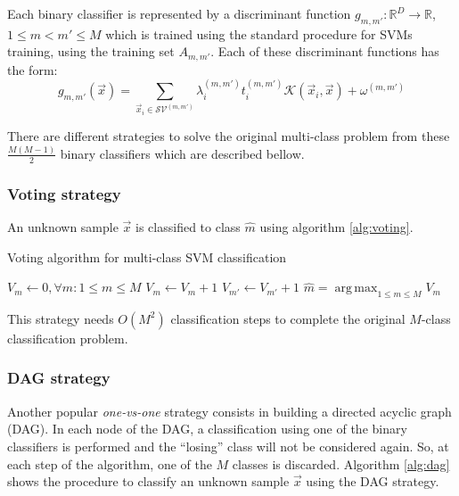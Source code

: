 \documentclass[10pt,a4paper]{article}
\DeclareMathOperator*{\argmax}{arg\,max}
\begin{document}
Each binary classifier is represented by a discriminant function $g_{m,m'} : \mathbb{R}^D \rightarrow \mathbb{R}$, $1 \leq m < m' \leq M$ which is trained using the standard procedure for SVMs training, using the training set $A_{m,m'}$. Each of these discriminant functions has the form:\\

\begin{equation}
g_{m,m'}(\vec{x}) = \sum_{\vec{x}_i \in \mathcal{SV}^{(m,m')}} \lambda_i^{(m,m')} t_i^{(m,m')} \mathcal{K}(\vec{x}_i, \vec{x}) + \omega^{(m,m')}
\end{equation}

There are different strategies to solve the original multi-class problem from these $\frac{M (M-1)}{2}$ binary classifiers which are described bellow.

\subsubsection{Voting strategy}\label{sec:voting}
An unknown sample $\vec{x}$ is classified to class $\hat{m}$ using algorithm \ref{alg:voting}.\\

\begin{algorithm}[h]
\caption{Voting algorithm for multi-class SVM classification}
\label{alg:voting}
\begin{algorithmic}
\State $V_m \leftarrow 0, \forall m : 1 \leq m \leq M$
			\State $V_m \leftarrow V_m + 1$
		\Else
			\State $V_{m'} \leftarrow V_{m'} + 1$
		\EndIf
	\EndFor
\EndFor
\State $\hat{m} = \argmax_{1 \leq m \leq M} V_m$
\end{algorithmic}
\end{algorithm}

This strategy needs $O(M^2)$ classification steps to complete the original $M$-class classification problem.

\subsubsection{DAG strategy}\label{sec:dag}
Another popular \emph{one-vs-one} strategy consists in building a directed acyclic graph (DAG)\cite{platt2000large}. In each node of the DAG, a classification using one of the binary classifiers is performed and the ``losing'' class will not be considered again. So, at each step of the algorithm, one of the $M$ classes is discarded. Algorithm \ref{alg:dag} shows the procedure to classify an unknown sample $\vec{x}$ using the DAG strategy.\\
\end{document}

